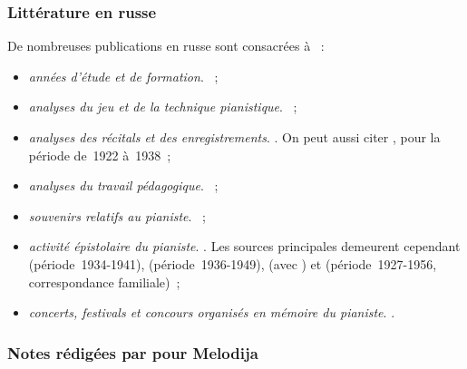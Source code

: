 \subsubsection{Littérature en russe}

De nombreuses publications en russe sont consacrées à \VSofronitsky{}~:
\begin{itemize}
 \item\emph{années d'étude et de formation}.
 \citet{Alshvang39, Bogdanov67b, Milshteyn65, Modyel88, Strelnikov}~;
 \item\emph{analyses du jeu et de la technique pianistique}.
 \citet{Afanassiev01, Blagoj00, Cheblokova, Chigareva10, Chinaiev95,
 Chinaiev17, Chitruk97, Chitruk10, Chopin10, Dubinina96, Kiseleva99,
 Lukjanova05, Neuhaus88, Orlovsky07, Sholpo96, Tropp01, Tsypine06,
 Zhukova03}~;
 \item\emph{analyses des récitals et des enregistrements}.
 \citet{Aleksandrova52, Badeyan02, Cereteli04, Drozdov35, Drozdov46,
 Gakkel86, Karatygin, Kazanskaja95, Lobanov02b, Lobanov07, Nestieva78,
 Nikitine68, Shliefstein45, Shliefstein, Strelnikov23, Zitomirsky46}.
 On peut aussi citer \citet[p.~371-388]{Nikonovich08}, pour la période
 de~1922 à~1938~;
 \item\emph{analyses du travail pédagogique}.
 \citet{Cheblokova, Fedorovich14, Guzenko22, Orlovsky14b, Sturtsel03,
 Zhukova68}~;
 \item\emph{souvenirs relatifs au pianiste}.
 \citet{Bajaxunova14, Golubovskaya94, Lobanov98, Perelman99, Richter87,
 Richter00, Scriabine19, Sofronitsky00, Trazevskaya09, Vasilieva08,
 Vizel96}~;
 \item\emph{activité épistolaire du pianiste}.
 \citet{Krasilchtchik80, Kuznetsov95, Nekrasova94, Nekrasova95,
 Ramazanova97, Sofronitsky01}.
 Les sources principales demeurent cependant \citet[p.~13-34]{Kogan08}
 (période~1934-1941), \citet[p.~190-197]{Nekrasova08} (période~1936-1949),
 \citet[p.~360-367]{NikonovichScriabine08} (avec \VMeyerhold{}) et
 \citet[p.~289-346]{Scriabine13b} (période~1927-1956, correspondance
 familiale)~;
 \item\emph{concerts, festivals et concours organisés en mémoire du
 pianiste}.
 \citet{Birjukov01, Petropavlov01, Shelepova01, Zelenev01, Zhukova02}.
\end{itemize}

\subsubsection{Notes rédigées par \citeauthor{Nikonovich79} pour Melodija}
\label{sssec:NotesNikonovich}

